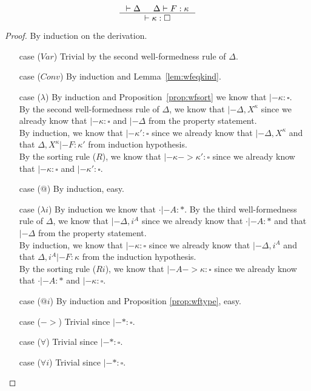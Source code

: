 \begin{proposition}
\label{prop:wfkind}
\[ \inference{ |- \Delta & \Delta |- F : \kappa}{ |- \kappa:\square }
\]
\end{proposition}
\begin{proof} By induction on the derivation.
\begin{itemize}
\item[case] ($Var$)
	Trivial by the second well-formedness rule of $\Delta$.
\item[case] ($Conv$)
	By induction and Lemma~\ref{lem:wfeqkind}.
\item[case] ($\lambda$)
	By induction and Proposition~\ref{prop:wfsort} we know
	that $|- \kappa:\square$.\\
	By the second well-formedness rule of $\Delta$,
	we know that $|- \Delta,X^\kappa$ since we already know
	that $|- \kappa:\square$ and $|- \Delta$ from the property statement.\\
	By induction, we know that $|- \kappa':\square$
	since we already know that $|- \Delta,X^\kappa$ and
	that $\Delta,X^\kappa|- F:\kappa'$ from induction hypothesis.\\
	By the sorting rule ($R$), we know that $|- \kappa -> \kappa':\square$
	since we already know that $|- \kappa:\square$ and $|- \kappa':\square$.
\item[case] ($@$)
	By induction, easy.
\item[case] ($\lambda i$)
	By induction we know that $\cdot|- A:*$.
	By the third well-formedness rule of $\Delta$, we know that
	$|- \Delta,i^A$ since we already know that $\cdot|- A:*$ and
	that $|- \Delta$ from the property statement.\\
	By induction, we know that $|- \kappa:\square$
	since we already know that $|- \Delta,i^A$ and
	that $\Delta,i^A|- F:\kappa$ from the induction hypothesis.\\
	By the sorting rule ($Ri$), we know that $|- A -> \kappa:\square$
	since we already know that $\cdot |- A:*$ and $|- \kappa:\square$.
\item[case] ($@i$)
	By induction and Proposition \ref{prop:wftype}, easy.
\item[case] ($->$)
	Trivial since $|- * : \square$.
\item[case] ($\forall$)
	Trivial since $|- * : \square$.
\item[case] ($\forall i$)
	Trivial since $|- * : \square$.\qedhere
\end{itemize}
\end{proof}

